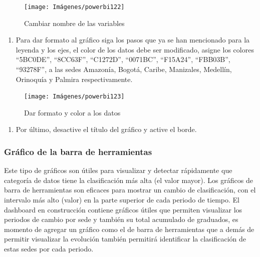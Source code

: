 \documentclass[
]{book}
\providecommand{\tightlist}{%
  \setlength{\itemsep}{0pt}\setlength{\parskip}{0pt}}
\begin{document}
\begin{figure}

{\centering \texttt{[image: Imágenes/powerbi122]} 

}

\caption{Cambiar nombre de las variables}\label{fig:paso5graficoareas-fig}
\end{figure}

\begin{enumerate}
\def\labelenumi{\arabic{enumi}.}
\setcounter{enumi}{5}
\tightlist
\item
  Para dar formato al gráfico siga los pasos que ya se han mencionado para la leyenda y los ejes, el color de los datos debe ser modificado, asigne los colores ``5BC0DE'', ``8CC63F'', ``C1272D'', ``0071BC'', ``F15A24'', ``FBB03B'', ``93278F'', a las sedes Amazonía, Bogotá, Caribe, Manizales, Medellín, Orinoquía y Palmira respectivamente.
\end{enumerate}

\begin{figure}

{\centering \texttt{[image: Imágenes/powerbi123]} 

}

\caption{Dar formato y color a los datos}\label{fig:paso6graficoareas-fig}
\end{figure}

\begin{enumerate}
\def\labelenumi{\arabic{enumi}.}
\setcounter{enumi}{6}
\tightlist
\item
  Por último, desactive el título del gráfico y active el borde.
\end{enumerate}

\hypertarget{gruxe1fico-de-la-barra-de-herramientas}{%
\subsubsection{Gráfico de la barra de herramientas}\label{gruxe1fico-de-la-barra-de-herramientas}}

Este tipo de gráficos son útiles para visualizar y detectar rápidamente que categoría de datos tiene la clasificación más alta (el valor mayor). Los gráficos de barra de herramientas son eficaces para mostrar un cambio de clasificación, con el intervalo más alto (valor) en la parte superior de cada periodo de tiempo.
El dashboard en construcción contiene gráficos útiles que permiten visualizar los periodos de cambio por sede y también su total acumulado de graduados, es momento de agregar un gráfico como el de barra de herramientas que a demás de permitir visualizar la evolución también permitirá identificar la clasificación de estas sedes por cada periodo.
\end{document}
